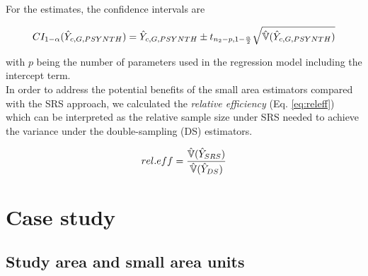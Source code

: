 For the \psynth{} estimates, the confidence intervals are


\begin{equation}\label{ci_2phase_psynth}
CI_{1-\alpha}(\hat{Y}_{c,G,PSYNTH})=\hat{Y}_{c,G,PSYNTH} \pm t_{n_{2}-p, 1-\frac{\alpha}{2}}\sqrt{\hat{\mathbb{V}}(\hat{Y}_{c,G,PSYNTH})}
\end{equation}

\noindent with $p$ being the number of parameters used in the regression model including the intercept term.\\

In order to address the potential benefits of the small area estimators compared with the SRS approach, we calculated the \textit{relative efficiency} (Eq. \ref{eq:releff}) which can be interpreted as the relative sample size under SRS needed to achieve the variance under the double-sampling (DS) estimators.

\begin{equation}\label{eq:releff}
rel.eff=\frac{\hat{\mathbb{V}}(\hat{Y}_{SRS})}{\hat{\mathbb{V}}(\hat{Y}_{DS})}
\end{equation}

\section{Case study}
\label{sec:CaseStudy}


\subsection{Study area and small area units}
\label{sec:studyarea}

